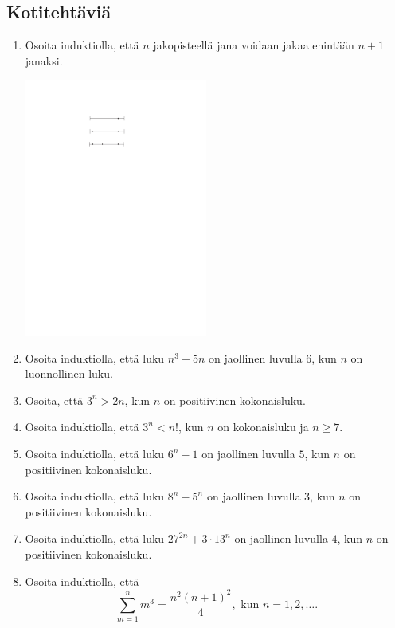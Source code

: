 \subsection*{Kotitehtäviä}

\begin{enumerate}

\item Osoita induktiolla, että $n$ jakopisteellä jana voidaan jakaa enintään $n + 1$ janaksi.

\begin{center}
\includegraphics[width=6cm]{pictures/Kappale5_4_janat_v2}
\end{center}

\item Osoita induktiolla, että luku $n^3 + 5n$ on jaollinen luvulla $6$, kun $n$ on luonnollinen luku.

\item Osoita, että $3^n > 2n$, kun $n$ on positiivinen kokonaisluku.

\item Osoita induktiolla, että $3^n < n!$, kun $n$ on kokonaisluku ja $n\ge 7$.

\item Osoita induktiolla, että luku $6^n - 1$ on jaollinen luvulla $5$, kun $n$ on positiivinen kokonaisluku.

\item Osoita induktiolla, että luku $8^n - 5^n$ on jaollinen luvulla $3$, kun $n$ on positiivinen kokonaisluku.

\item Osoita induktiolla, että luku $27^{2n} + 3 \cdot 13^{n}$ on jaollinen luvulla $4$, kun $n$ on positiivinen kokonaisluku.

\item 
Osoita induktiolla, että
\[
\sum_{m=1}^n m^3= \frac{n^2(n+1)^2}{4}, \textrm{ kun } n=1,2,\ldots.
\]


\end{enumerate}
